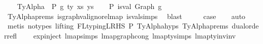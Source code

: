 \begin{isabellebody}
\isamarkupfalse%
\isanewline
\ \ \isamarkupfalse%
\ {\isacharparenleft}{\kern0pt}TyAlpha\ {\isasymGamma}{}\ P\ g\ ty\ xs\ ys{\isacharparenright}{\kern0pt}\isanewline
\ \ \isamarkupfalse%
\ P{}{\isacharcolon}{\kern0pt}\ {\isachardoublequoteopen}is{\isacharunderscore}{\kern0pt}val\ {\isacharparenleft}{\kern0pt}Graph\ g{\isacharparenright}{\kern0pt}{\isachardoublequoteclose}\isanewline
\ \ \ \ \isamarkupfalse%
\ TyAlpha{\isachardot}{\kern0pt}prems{\isacharparenleft}{\kern0pt}{}{\isacharparenright}{\kern0pt}\ is{\isacharunderscore}{\kern0pt}graph{\isacharunderscore}{\kern0pt}val{\isacharunderscore}{\kern0pt}ignore{\isacharunderscore}{\kern0pt}lmap\ is{\isacharunderscore}{\kern0pt}val{\isachardot}{\kern0pt}simps{\isacharparenleft}{\kern0pt}{}{\isacharparenright}{\kern0pt}\ \isamarkupfalse%
\ blast\isanewline
\ \ \isamarkupfalse%
\ \isamarkupfalse%
\ {\isacharquery}{\kern0pt}case\isanewline
\ \ \isamarkupfalse%
\ auto\isanewline
\ \ \isamarkupfalse%
\ {\isacharparenleft}{\kern0pt}metis\ {\isacharparenleft}{\kern0pt}no{\isacharunderscore}{\kern0pt}types{\isacharcomma}{\kern0pt}\ lifting{\isacharparenright}{\kern0pt}\ FL{\isacharunderscore}{\kern0pt}typing{\isacharunderscore}{\kern0pt}LRHS\ P{}\ TyAlpha{\isachardot}{\kern0pt}hyps{\isacharparenleft}{\kern0pt}{}{\isacharcomma}{\kern0pt}{}{\isacharcomma}{\kern0pt}{}{\isacharcomma}{\kern0pt}{}{\isacharcomma}{\kern0pt}{}{\isacharcomma}{\kern0pt}{}{\isacharparenright}{\kern0pt}\ TyAlpha{\isachardot}{\kern0pt}prems{\isacharparenleft}{\kern0pt}{}{\isacharcomma}{\kern0pt}{}{\isacharparenright}{\kern0pt}\ dual{\isacharunderscore}{\kern0pt}order{\isachardot}{\kern0pt}refl\isanewline
\ \ \ \ exp{\isachardot}{\kern0pt}inject{\isacharparenleft}{\kern0pt}{}{\isacharparenright}{\kern0pt}\ lmap{\isachardot}{\kern0pt}simps{\isacharparenleft}{\kern0pt}{}{\isacharparenright}{\kern0pt}\ lmap{\isacharunderscore}{\kern0pt}graph{\isacharunderscore}{\kern0pt}cong\ lmap{\isacharunderscore}{\kern0pt}ty{\isachardot}{\kern0pt}simps{\isacharparenleft}{\kern0pt}{}{\isacharparenright}{\kern0pt}\ lmap{\isacharunderscore}{\kern0pt}ty{\isacharunderscore}{\kern0pt}inv{\isacharunderscore}{\kern0pt}inv{\isacharparenright}{\kern0pt}\isanewline
{}\isamarkupfalse%
\isanewline

\end{isabellebody}
